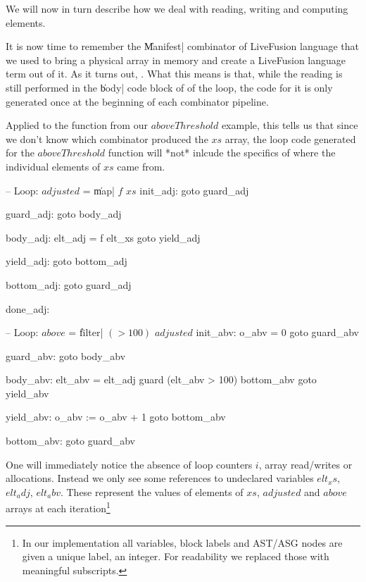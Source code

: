 \documentclass[preamble.tex]{subfiles}
\begin{document}
We will now in turn describe how we deal with reading, writing and computing elements.

It is now time to remember the \|Manifest| combinator of LiveFusion language that we used to bring a physical array in memory and create a LiveFusion language term out of it. As it turns out, . What this means is that, while the reading is still performed in the \|body| code block of of the loop, the code for it is only generated once at the beginning of each combinator pipeline.

Applied to the function from our $aboveThreshold$ example, this tells us that since we don't know which combinator produced the $xs$ array, the loop code generated for the $aboveThreshold$ function will *not* inlcude the specifics of where the individual elements of $xs$ came from.

\begin{loopcode}
  -- Loop: $adjusted$ = \|map| $f$ $xs$
  init_adj:
    goto guard_adj

  guard_adj:
    goto body_adj

  body_adj:
    elt_adj = f elt_xs
    goto yield_adj

  yield_adj:
    goto bottom_adj

  bottom_adj:
    goto guard_adj

  done_adj:


  -- Loop: $above$ = \|filter| $(>100)$ $adjusted$
  init_abv:
    o_abv = 0
    goto guard_abv

  guard_abv:
    goto body_abv

  body_abv:
    elt_abv = elt_adj
    guard (elt_abv > 100) bottom_abv
    goto yield_abv

  yield_abv:
    o_abv := o_abv + 1
    goto bottom_abv

  bottom_abv:
    goto guard_abv
\end{loopcode}

One will immediately notice the absence of loop counters $i$, array read/writes or allocations. Instead we only see some references to undeclared variables $elt_xs$, $elt_adj$, $elt_abv$. These represent the values of elements of $xs$, $adjusted$ and $above$ arrays at each iteration\footnote{In our implementation all variables, block labels and AST/ASG nodes are given a unique label, an integer. For readability we replaced those with meaningful subscripts.}
\end{document}
